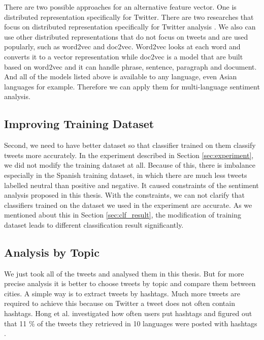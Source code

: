 There are two possible approaches for an alternative feature vector.
One is distributed representation specifically for Twitter.
There are two researches that focus on distributed representation specifically for Twitter analysis \cite{tweet2vec1} \cite{tweet2vec2}.
We also can use other distributed representations that do not focus on tweets and are used popularly, such as word2vec and doc2vec.
Word2vec looks at each word and converts it to a vector representation while doc2vec is a model that are built based on word2vec and it can handle phrase, sentence, paragraph and document.
And all of the models listed above is available to any language, even Asian languages for example.
Therefore we can apply them for multi-language sentiment analysis.

\subsection{Improving Training Dataset}
Second, we need to have better dataset so that classifier trained on them classify tweets more accurately.
In the experiment described in Section \ref{sec:experiment}, we did not modify the training dataset at all.
Because of this, there is imbalance especially in the Spanish training dataset, in which there are much less tweets labelled neutral than positive and negative.
It caused constraints of the sentiment analysis proposed in this thesis.
With the constraints, we can not clarify that classifiers trained on the dataset we used in the experiment are accurate.
As we mentioned about this in Section \ref{sec:clf_result}, the modification of training dataset leads to different classification result significantly.



\subsection{Analysis by Topic}
We just took all of the tweets and analysed them in this thesis.
But for more precise analysis it is better to choose tweets by topic and compare them between cities.
A simple way is to extract tweets by hashtags.
Much more tweets are required to achieve this because on Twitter a tweet does not often contain hashtags.
Hong et al. investigated how often users put hashtags and figured out that 11 \% of the tweets they retrieved in 10 languages were posted with hashtags \cite{hong}.
